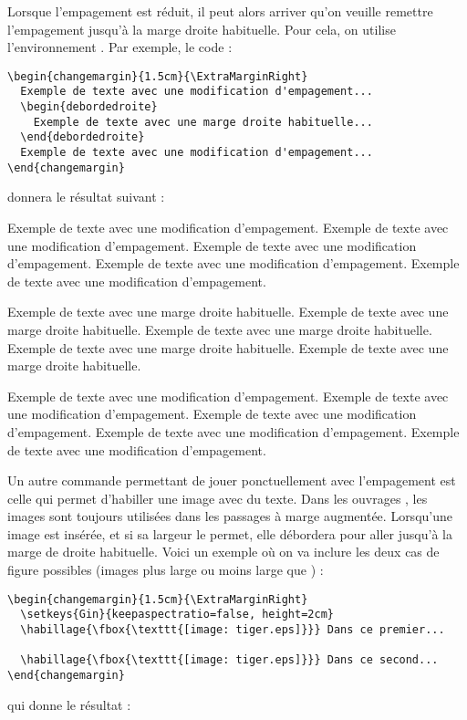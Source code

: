 \documentclass[nocrop]{sesamanuel}
\begin{document}
Lorsque l'empagement est réduit, il peut alors arriver qu'on veuille
remettre l'empagement jusqu'à la marge droite habituelle. Pour cela,
on utilise l'environnement . Par exemple, le
code :
\begin{verbatim}
\begin{changemargin}{1.5cm}{\ExtraMarginRight}
  Exemple de texte avec une modification d'empagement...
  \begin{debordedroite}
    Exemple de texte avec une marge droite habituelle...
  \end{debordedroite}
  Exemple de texte avec une modification d'empagement...
\end{changemargin}
\end{verbatim}
donnera le résultat suivant :
\begin{changemargin}{1.5cm}{\ExtraMarginRight}
  Exemple de texte avec une modification d'empagement. Exemple de
  texte avec une modification d'empagement. Exemple de texte avec une
  modification d'empagement. Exemple de texte avec une modification
  d'empagement. Exemple de texte avec une modification d'empagement.
  \begin{debordedroite}
    Exemple de texte avec une marge droite habituelle. Exemple de
    texte avec une marge droite habituelle. Exemple de texte avec une
    marge droite habituelle. Exemple de texte avec une marge droite
    habituelle. Exemple de texte avec une marge droite habituelle.
  \end{debordedroite}
  Exemple de texte avec une modification d'empagement. Exemple de
  texte avec une modification d'empagement. Exemple de texte avec une
  modification d'empagement. Exemple de texte avec une modification
  d'empagement. Exemple de texte avec une modification d'empagement.
\end{changemargin}

Un autre commande permettant de jouer ponctuellement avec l'empagement
est celle qui permet d'habiller une image avec du texte. Dans les
ouvrages \Logosesa{}, les images sont toujours utilisées dans les
passages à marge augmentée. Lorsqu'une image est insérée, et si sa
largeur le permet, elle débordera pour aller jusqu'à la marge de
droite habituelle. Voici un exemple où on va inclure les deux cas de
figure possibles (images plus large ou moins large que
) :
\begin{verbatim}
\begin{changemargin}{1.5cm}{\ExtraMarginRight}
  \setkeys{Gin}{keepaspectratio=false, height=2cm}
  \habillage{\fbox{\texttt{[image: tiger.eps]}}} Dans ce premier...

  \habillage{\fbox{\texttt{[image: tiger.eps]}}} Dans ce second...
\end{changemargin}
\end{verbatim}
qui donne le résultat :
\end{document}
